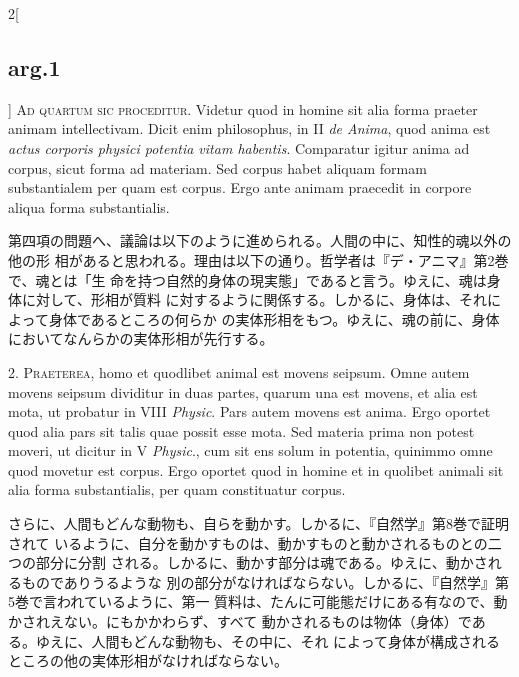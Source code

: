 \documentclass[paper=a4paper,fontsize=10pt,jafontsize=9pt,titlepage]{jlreq}
\begin{document}
\begin{paracol}{2}[\subsection{arg.1}]
{\scshape Ad quartum sic proceditur}. Videtur quod in homine sit alia forma
praeter animam intellectivam. Dicit enim philosophus, in II {\itshape de Anima},
quod anima est {\itshape actus corporis physici potentia vitam
habentis}. Comparatur igitur anima ad corpus, sicut forma ad materiam. Sed
corpus habet aliquam formam substantialem per quam est corpus. Ergo ante animam
praecedit in corpore aliqua forma substantialis.

\switchcolumn

 第四項の問題へ、議論は以下のように進められる。人間の中に、知性的魂以外の他の形
 相があると思われる。理由は以下の通り。哲学者は『デ・アニマ』第2巻で、魂とは「生
 命を持つ自然的身体の現実態」であると言う。ゆえに、魂は身体に対して、形相が質料
 に対するように関係する。しかるに、身体は、それによって身体であるところの何らか
 の実体形相をもつ。ゆえに、魂の前に、身体においてなんらかの実体形相が先行する。
 


2. {\scshape Praeterea}, homo et quodlibet animal est movens seipsum. Omne autem
movens seipsum dividitur in duas partes, quarum una est movens, et alia est
mota, ut probatur in VIII {\itshape Physic}. Pars autem movens est anima. Ergo
oportet quod alia pars sit talis quae possit esse mota. Sed materia prima non
potest moveri, ut dicitur in V {\itshape Physic}., cum sit ens solum in
potentia, quinimmo omne quod movetur est corpus. Ergo oportet quod in homine et
in quolibet animali sit alia forma substantialis, per quam constituatur corpus.

\switchcolumn

 さらに、人間もどんな動物も、自らを動かす。しかるに、『自然学』第8巻で証明されて
 いるように、自分を動かすものは、動かすものと動かされるものとの二つの部分に分割
 される。しかるに、動かす部分は魂である。ゆえに、動かされるものでありうるような
 別の部分がなければならない。しかるに、『自然学』第5巻で言われているように、第一
 質料は、たんに可能態だけにある有なので、動かされえない。にもかかわらず、すべて
 動かされるものは物体（身体）である。ゆえに、人間もどんな動物も、その中に、それ
 によって身体が構成されるところの他の実体形相がなければならない。
 

\end{paracol}
\end{document}
